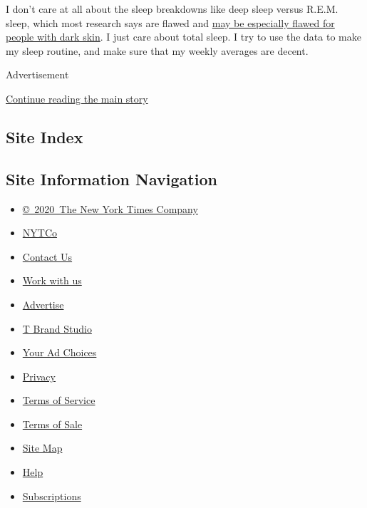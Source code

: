 I don't care at all about the sleep breakdowns like deep sleep versus
R.E.M. sleep, which most research says are flawed and
\href{https://www.statnews.com/2019/07/24/fitbit-accuracy-dark-skin/}{may
be especially flawed for people with dark skin}. I just care about total
sleep. I try to use the data to make my sleep routine, and make sure
that my weekly averages are decent.

Advertisement

\protect\hyperlink{after-bottom}{Continue reading the main story}

\hypertarget{site-index}{%
\subsection{Site Index}\label{site-index}}

\hypertarget{site-information-navigation}{%
\subsection{Site Information
Navigation}\label{site-information-navigation}}

\begin{itemize}
\tightlist
\item
  \href{https://help.nytimes3xbfgragh.onion/hc/en-us/articles/115014792127-Copyright-notice}{©~2020~The
  New York Times Company}
\end{itemize}

\begin{itemize}
\tightlist
\item
  \href{https://www.nytco.com/}{NYTCo}
\item
  \href{https://help.nytimes3xbfgragh.onion/hc/en-us/articles/115015385887-Contact-Us}{Contact
  Us}
\item
  \href{https://www.nytco.com/careers/}{Work with us}
\item
  \href{https://nytmediakit.com/}{Advertise}
\item
  \href{http://www.tbrandstudio.com/}{T Brand Studio}
\item
  \href{https://www.nytimes3xbfgragh.onion/privacy/cookie-policy\#how-do-i-manage-trackers}{Your
  Ad Choices}
\item
  \href{https://www.nytimes3xbfgragh.onion/privacy}{Privacy}
\item
  \href{https://help.nytimes3xbfgragh.onion/hc/en-us/articles/115014893428-Terms-of-service}{Terms
  of Service}
\item
  \href{https://help.nytimes3xbfgragh.onion/hc/en-us/articles/115014893968-Terms-of-sale}{Terms
  of Sale}
\item
  \href{https://spiderbites.nytimes3xbfgragh.onion}{Site Map}
\item
  \href{https://help.nytimes3xbfgragh.onion/hc/en-us}{Help}
\item
  \href{https://www.nytimes3xbfgragh.onion/subscription?campaignId=37WXW}{Subscriptions}
\end{itemize}
